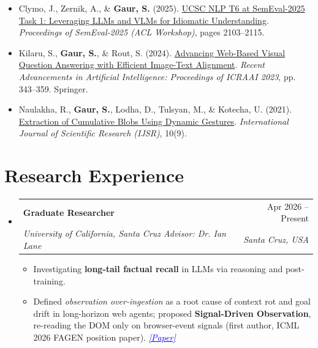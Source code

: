 \documentclass[letterpaper,11pt]{article}
\makeatletter
\newcommand{\resumeItem}[1]{
  \item{
    {#1 \vspace{-4pt}}
  }
}
\newcommand{\resumeSubheading}[4]{
  \vspace{-2pt}\item
    \begin{tabular*}{0.97\textwidth}[t]{l@{\extracolsep{\fill}}r}
      \textbf{#1} & #2 \\
      \textit{\small #3} & \textit{\small #4} \\
    \end{tabular*}\vspace{-10pt}
}
\newcommand{\resumeSubHeadingListStart}{\begin{itemize}[leftmargin=0.15in, label={}]}
\newcommand{\resumeSubHeadingListEnd}{\end{itemize}}
\newcommand{\resumeItemListStart}{\begin{itemize}}
\newcommand{\resumeItemListEnd}{\end{itemize}\vspace{-2pt}}
\newcommand{\paperlink}[2]{\href{#1}{\textcolor{blue}{\textit{[#2]}}}}
\makeatother
\begin{document}
\begin{itemize}[leftmargin=0.25in, labelsep=0.08in]
  \textit{ICML 2026 AIWILD: Safety, Security, and Beyond Workshop.}
  \item[{[8]}] Clymo, J., Zernik, A., \& \textbf{Gaur, S.} (2025).
  \href{https://aclanthology.org/2025.semeval-1.274/}{UCSC NLP T6 at SemEval-2025 Task 1: Leveraging LLMs and VLMs for Idiomatic Understanding}.
  \textit{Proceedings of SemEval-2025 (ACL Workshop)}, pages 2103--2115.
  \item[{[9]}] Kilaru, S., \textbf{Gaur, S.}, \& Rout, S. (2024).
  \href{https://link.springer.com/chapter/10.1007/978-981-97-1111-6_28}{Advancing Web-Based Visual Question Answering with Efficient Image-Text Alignment}.
  \textit{Recent Advancements in Artificial Intelligence: Proceedings of ICRAAI 2023}, pp. 343--359. Springer.
  \item[{[10]}] Naulakha, R., \textbf{Gaur, S.}, Lodha, D., Tulsyan, M., \& Kotecha, U. (2021).
  \href{https://arxiv.org/abs/2501.04002}{Extraction of Cumulative Blobs Using Dynamic Gestures}.
  \textit{International Journal of Scientific Research (IJSR)}, 10(9).
\end{itemize}

\section{Research Experience}
\resumeSubHeadingListStart

\resumeSubheading
  {Graduate Researcher}{Apr 2026 -- Present}
  {University of California, Santa Cruz \textbullet{} Advisor: Dr. Ian Lane}{Santa Cruz, USA}
  \resumeItemListStart
    \small
    \resumeItem{Investigating \textbf{long-tail factual recall} in LLMs via reasoning and post-training.}
    \resumeItem{Defined \textit{observation over-ingestion} as a root cause of context rot and goal drift in long-horizon web agents; proposed \textbf{Signal-Driven Observation}, re-reading the DOM only on browser-event signals (first author, ICML 2026 FAGEN position paper). \paperlink{https://arxiv.org/abs/2606.06708}{Paper}}
  \resumeItemListEnd
\resumeSubHeadingListEnd
\end{document}
